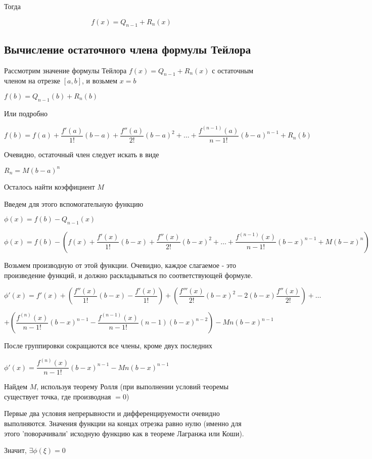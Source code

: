 Тогда

$$
f(x) = Q_{n-1} + R_n(x)
$$

\subsection{Вычисление остаточного члена формулы Тейлора}

Рассмотрим значение формулы Тейлора $ f(x) = Q_{n-1} + R_n(x) $ с остаточным членом на отрезке $ [a,b] $,
и возьмем $ x = b $

$ f(b) = Q_{n-1}(b) + R_n(b) $

Или подробно

$ f(b) = 
f(a) + \dfrac{f'(a)}{1!}(b-a) 
+ \dfrac{f''(a)}{2!}(b-a)^{2} 
+ \ldots 
+ \dfrac{f^{(n-1)}(a)}{n-1!}(b-a)^{n-1} + R_n(b) $

Очевидно, остаточный член следует искать в виде

$ R_n = M(b-a)^{n} $

Осталось найти коэффициент $ M $

Введем для этого вспомогательную функцию

$ \phi(x) = f(b) - Q_{n-1}(x) $

$ \phi(x) = f(b) - \left(  f(x) + \dfrac{f'(x)}{1!}(b-x)
+ \dfrac{f''(x)}{2!}(b-x)^{2} 
+ \ldots 
+ \dfrac{f^{(n-1)}(x)}{n-1!}(b-x)^{n-1} + M (b-x)^{n}\right)  $

Возьмем производную от этой функции. Очевидно, каждое слагаемое - это произведение функций, и должно раскладываться по соответствующей формуле.

$ \phi'(x) = 
f'(x)
+ \left( \dfrac{f''(x)}{1!}(b-x) - \dfrac{f'(x)}{1!} \right) 
+ \left(  \dfrac{f'''(x)}{2!}(b-x)^{2} - 2(b-x)\dfrac{f''(x)}{2!} \right) 
+ \ldots$

$+ \left(  \dfrac{f^{(n)}(x)}{n-1!}(b-x)^{n-1} -  \dfrac{f^{(n-1)}(x)}{n-1!}(n-1)(b-x)^{n-2} \right)
- M n(b-x)^{n-1}$

После группировки сокращаются все члены, кроме двух последних

$ \phi'(x) = \dfrac{f^{(n)}(x)}{n-1!}(b-x)^{n-1} - M n(b-x)^{n-1} $

Найдем $ M $, используя теорему Ролля (при выполнении условий теоремы существует точка, где производная $ = 0 $)

Первые два условия непрерывности и дифференцируемости очевидно выполняются.
Значения функции на концах отрезка равно нулю (именно для этого 'поворачивали' исходную функцию как в теореме Лагранжа или Коши).

Значит, $ \exists \phi(\xi) = 0 $

